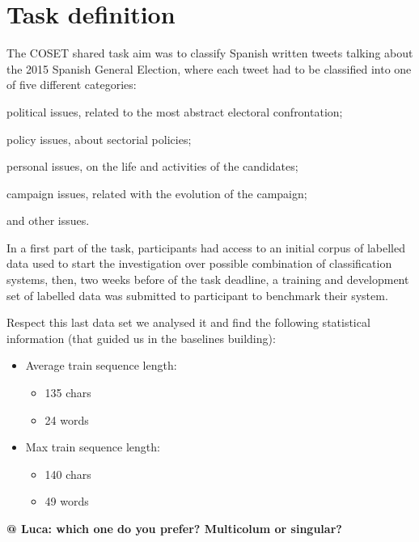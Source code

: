 \section{Task definition} \label{sec:task}

The COSET shared task aim was to classify Spanish written tweets talking about the 2015 Spanish General Election, where each tweet had to be classified into one of five different categories:
\begin{enumerate*}
\item political issues, related to the most abstract electoral confrontation; 
\item policy issues, about sectorial policies; 
\item personal issues, on the life and activities of the candidates; 
\item campaign issues, related with the evolution of the campaign;
\item and other issues.
\end{enumerate*}

In a first part of the task, participants had access to an initial corpus of labelled data used to start the investigation over possible combination of classification systems, then, two weeks before of the task deadline, a training and development set of labelled data was submitted to participant to benchmark their system.

Respect this last data set we analysed it and find the following statistical information (that guided us in the baselines building):
\begin{multicols}{2}
\begin{itemize}
	\item Average train sequence length:
	\begin{itemize}
		\item 135 chars 
		\item 24 words
	\end{itemize}
	\item Max train sequence length: 
	\begin{itemize}
		\item 140 chars
		\item 49 words
	\end{itemize}
\end{itemize}
\end{multicols}



\textbf{@ Luca: which one do you prefer? Multicolum or singular?}
